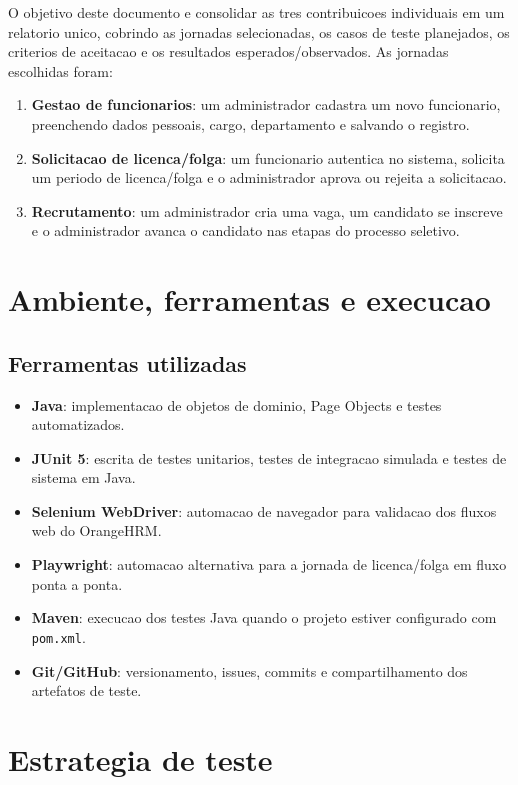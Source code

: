\documentclass[12pt,a4paper]{article}
\newcommand{\Comando}[1]{\texttt{#1}}
\begin{document}
O objetivo deste documento e consolidar as tres contribuicoes individuais em um relatorio unico, cobrindo as jornadas selecionadas, os casos de teste planejados, os criterios de aceitacao e os resultados esperados/observados. As jornadas escolhidas foram:

\begin{enumerate}
    \item \textbf{Gestao de funcionarios}: um administrador cadastra um novo funcionario, preenchendo dados pessoais, cargo, departamento e salvando o registro.
    \item \textbf{Solicitacao de licenca/folga}: um funcionario autentica no sistema, solicita um periodo de licenca/folga e o administrador aprova ou rejeita a solicitacao.
    \item \textbf{Recrutamento}: um administrador cria uma vaga, um candidato se inscreve e o administrador avanca o candidato nas etapas do processo seletivo.
\end{enumerate}

\newpage
\section{Ambiente, ferramentas e execucao}

\subsection{Ferramentas utilizadas}

\begin{itemize}
    \item \textbf{Java}: implementacao de objetos de dominio, Page Objects e testes automatizados.
    \item \textbf{JUnit 5}: escrita de testes unitarios, testes de integracao simulada e testes de sistema em Java.
    \item \textbf{Selenium WebDriver}: automacao de navegador para validacao dos fluxos web do OrangeHRM.
    \item \textbf{Playwright}: automacao alternativa para a jornada de licenca/folga em fluxo ponta a ponta.
    \item \textbf{Maven}: execucao dos testes Java quando o projeto estiver configurado com \Comando{pom.xml}.
    \item \textbf{Git/GitHub}: versionamento, issues, commits e compartilhamento dos artefatos de teste.
\end{itemize}

\section{Estrategia de teste}
\end{document}
